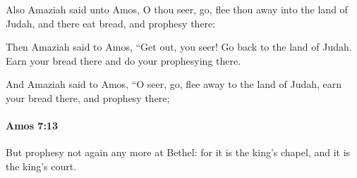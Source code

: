 			\begin{versebox}
					\item[BHS] 
					\item[LXX] 
					\item[ASV] Also Amaziah said unto Amos, O thou seer, go, flee thou away into the land of Judah, and there eat bread, and prophesy there:
					\item[NIV] Then Amaziah said to Amos, “Get out, you seer! Go back to the land of Judah. Earn your bread there and do your prophesying there.
					\item[NRSV] And Amaziah said to Amos, “O seer, go, flee away to the land of Judah, earn your bread there, and prophesy there;
			\end{versebox}

		\paragraph{Amos 7:13} %
			\label{AMOS-7-13}

			But prophesy not again any more at Bethel: for it is the king’s chapel, and it is the king’s court.

